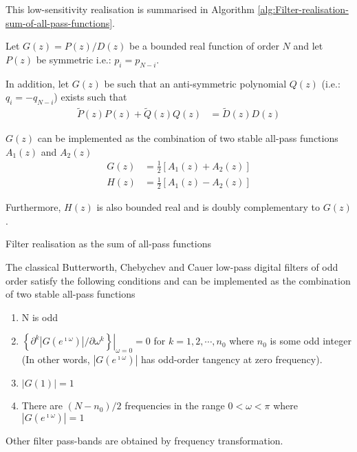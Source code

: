 \documentclass[a4paper,twoside,10pt,english]{report}
\begin{document}
This low-sensitivity realisation is summarised in Algorithm 
\ref{alg:Filter-realisation-sum-of-all-pass-functions}.
\begin{algorithm}[!htbp]
Let $G\left(z\right)=P\left(z\right)/D\left(z\right)$ be a bounded
real function of order $N$ and let $P\left(z\right)$ be symmetric
i.e.: $p_{i}=p_{N-i}$. 

In addition, let $G\left(z\right)$ be such
that an anti-symmetric polynomial $Q\left(z\right)$ (i.e.: $q_{i}=-q_{N-i}$)
exists such that 
\begin{align*}
\tilde{P}\left(z\right)P\left(z\right)+\tilde{Q}\left(z\right)Q\left(z\right) 
&= \tilde{D}\left(z\right)D\left(z\right)
\end{align*}

$G\left(z\right)$ can be implemented as the combination of two
stable all-pass functions $A_{1}\left(z\right)$ and $A_{2}\left(z\right)$
\begin{align*}
G\left(z\right) &= \frac{1}{2}\left[A_{1}\left(z\right)+A_{2}\left(z\right)\right]\\
H\left(z\right) &= \frac{1}{2}\left[A_{1}\left(z\right)-A_{2}\left(z\right)\right]
\end{align*}

Furthermore, $H\left(z\right)$ is also bounded real and is doubly
complementary to $G\left(z\right)$.
\caption{Filter realisation as the sum of all-pass functions}
\label{alg:Filter-realisation-sum-of-all-pass-functions}
\end{algorithm}

The classical Butterworth, Chebychev and Cauer low-pass digital filters
of odd order satisfy the following conditions and can be implemented
as the combination of two stable all-pass functions 
\begin{enumerate}
\item N is odd
\item $\left.\left\{ \partial^{k}\left|G\left(e^{\imath\omega}\right)\right|/\partial\omega^{k}\right\} \right|_{\omega=0}=0$
for $k=1,2,\cdots,n_{0}$ where $n_{0}$ is some odd integer \\
(In other words, $\left|G\left(e^{\imath\omega}\right)\right|$ has odd-order
tangency at zero frequency).
\item $\left|G\left(1\right)\right|=1$
\item There are $\left(N-n_{0}\right)/2$ frequencies in the range $0<\omega<\pi$
where $\left|G\left(e^{\imath\omega}\right)\right|=1$
\end{enumerate}
Other filter pass-bands are obtained by frequency transformation.
\end{document}
